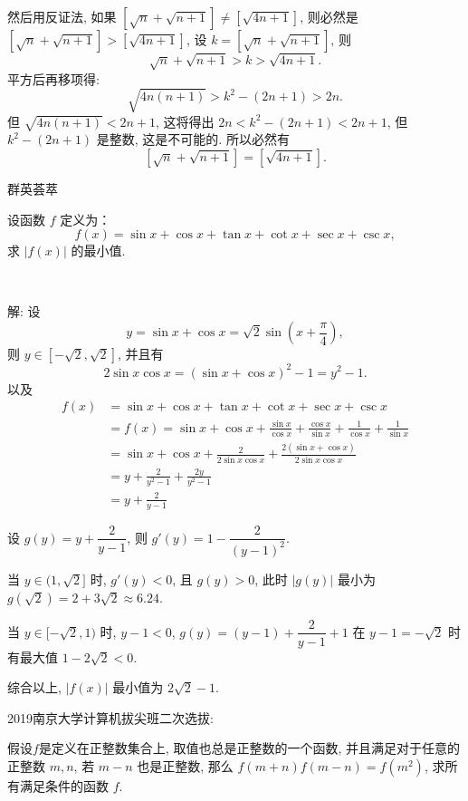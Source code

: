 然后用反证法, 如果 $\left[\sqrt{n} + \sqrt{n+1}\right] \neq \left[\sqrt{4n+1}\right]$, 则必然是 $\left[\sqrt{n} + \sqrt{n+1}\right] > \left[\sqrt{4n+1}\right]$, 设 $k = \left[\sqrt{n} + \sqrt{n+1}\right]$, 则
\[\sqrt{n} + \sqrt{n+1} > k > \sqrt{4n+1} .\]
平方后再移项得:
\[\sqrt{4n(n+1)} > k^2 - (2n+1) > 2n .\]
但 $\sqrt{4n(n+1)} < 2n+1$, 这将得出 $2n < k^2 - (2n+1) < 2n+1$, 但 $k^2 - (2n+1)$ 是整数, 这是不可能的. 所以必然有 
\[ \left[\sqrt{n} + \sqrt{n+1}\right] = \left[\sqrt{4n+1}\right] .\]


\newpage

\noindent 群英荟萃

设函数 $f$ 定义为：
\[f(x) = \sin x + \cos x + \tan x + \cot x + \sec x + \csc x ,\]
求 $ |f(x)| $ 的最小值.

~

解: 设 
\[ y = \sin x + \cos x = \sqrt{2}\sin(x+\frac{\pi}{4}), \]
则 $y\in[-\sqrt{2},\sqrt{2}]$, 并且有
\[2\sin x \cos x = (\sin x + \cos x)^2 - 1 = y^2 - 1 .\]
以及
\begin{align*}
f(x) &= \sin x + \cos x + \tan x + \cot x + \sec x + \csc x \\
&= f(x) = \sin x + \cos x + \frac{\sin x}{\cos x} + \frac{\cos x}{\sin x} + \frac{1}{\cos x} + \frac{1}{\sin x} \\
&= \sin x + \cos x + \frac{2}{2\sin x\cos x} + \frac{2(\sin x + \cos x)}{2\sin x\cos x}\\
&= y + \frac{2}{y^2 - 1} + \frac{2y}{y^2-1}\\
&= y+ \frac{2}{y-1}
\end{align*}

设 $g(y) = y + \dfrac{2}{y-1}$, 则 $g'(y) = 1 - \dfrac{2}{(y-1)^2}$. 

当 $y\in(1,\sqrt{2}]$ 时, $g'(y) < 0$, 且 $g(y) > 0$, 此时 $|g(y)|$ 最小为 $g(\sqrt{2}) = 2+3\sqrt{2}\approx 6.24$. 

当 $y\in[-\sqrt{2},1)$ 时, $y - 1 < 0$, $g(y) = (y-1) + \dfrac{2}{y-1} + 1$ 在 $y-1 = -\sqrt{2}$ 时有最大值 $1-2\sqrt{2} < 0$.

综合以上, $|f(x)|$ 最小值为 $2\sqrt{2}-1$.

\newpage

\noindent 2019南京大学计算机拔尖班二次选拔:

假设$f$是定义在正整数集合上, 取值也总是正整数的一个函数, 并且满足对于任意的正整数 $m,n$, 若 $m-n$ 也是正整数, 那么 $f(m+n)f(m-n)=f(m^2)$, 求所有满足条件的函数 $f$.

